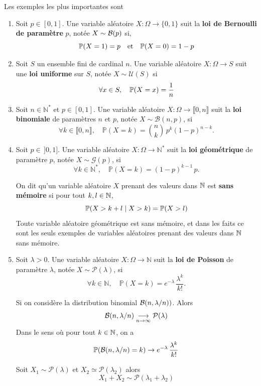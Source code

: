 \begin{exemple} Les exemples les plus importantes sont
	\begin{enumerate}
		\item Soit $p \in [0,1]$. Une variable aléatoire $X : \Omega \to \{0,1\}$ suit la \textbf{loi de Bernoulli de paramètre} $p$, notée $X \sim \B (p)$ si,
		\[
		\P(X = 1) = p \et \P(X = 0) = 1 -p
		\]
		
		\item Soit $S$ un ensemble fini de cardinal $n$. Une variable aléatoire $X : \Omega \to S$ suit une \textbf{loi uniforme} sur $S$, notée $X \sim \mathcal U(S)$ si
		\[
		\forall x \in S, \quad \P(X = x) = \frac1n
		\]
		\item Soit $n \in \mathbb{N}^*$ et $p \in [0, 1]$. Une variable aléatoire
		$X : \Omega \to \llbracket 0, n \rrbracket$ suit la \textbf{loi binomiale}
		de paramètres $n$ et $p$, notée $X \sim \mathcal{B}(n, p)$, si
		\[
		\forall k \in \llbracket 0, n \rrbracket, \quad
		\mathbb{P}(X = k) = \binom{n}{k}\, p^k (1-p)^{n-k}.
		\]
		\item Soit $p \in \, ]0, 1]$. Une variable aléatoire $X : \Omega \to \mathbb{N}^*$
		suit la \textbf{loi géométrique} de paramètre $p$, notée
		$X \sim \mathcal{G}(p)$, si
		\[
		\forall k \in \mathbb{N}^*, \quad
		\mathbb{P}(X = k) = (1-p)^{k-1}\, p.
		\]
		\begin{lemme}
			On dit qu'un variable aléatoire	$X$ prenant des valeurs dans $\N$ est \textbf{sans mémoire} si pour tout $k,l \in \N$,
			\[
			\P(X > k + l \mid X > k) = \P(X > l)
			\]
			Toute variable aléatoire géométrique est sans mémoire, et dans les faits ce sont les seuls exemples de variables aléatoires prenant des valeurs dans $\N$ sans mémoire.
		\end{lemme}
		\item Soit $\lambda > 0$. Une variable aléatoire $X : \Omega \to \mathbb{N}$
		suit la \textbf{loi de Poisson} de paramètre $\lambda$, notée
		$X \sim \mathcal{P}(\lambda)$, si
		\[
		\forall k \in \mathbb{N}, \quad
		\mathbb{P}(X = k) = e^{-\lambda}\, \frac{\lambda^k}{k!}.
		\]
		\begin{lemme}
			Si on considère la distribution binomial $\B(n, \lambda/n))$. Alors 
			\[
			\B(n, \lambda/n) \underset{n \to \infty}{\longrightarrow} \mathcal P(\lambda)
			\]
			Dans le sens où pour tout $k \in \N$, on a
			\[
			\P(\B(n, \lambda/n) = k) \to e^{-\lambda}\, \frac{\lambda^k}{k!}
			\]
		\end{lemme}
		
		
		\begin{lemme}
			Soit $X_1 \sim \mathcal P(\lambda)$ et $X_2 \simeq \mathcal P(\lambda_2)$ alors
			\[
			X_1 + X_2 \sim \mathcal P(\lambda_1 + \lambda_2)
			\]
		\end{lemme}
	\end{enumerate}
	
\end{exemple}



